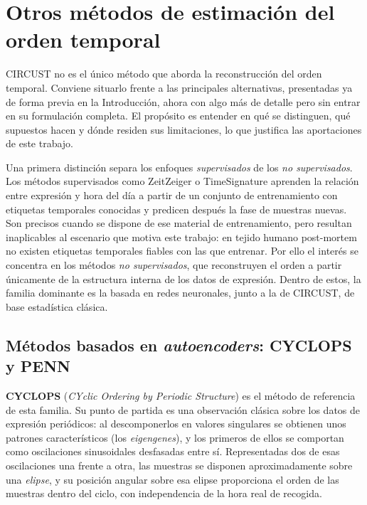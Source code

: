 \documentclass[12pt, a4paper]{report}
\begin{document}
\section{Otros métodos de estimación del orden temporal}
\label{sec:otros-metodos}

CIRCUST no es el único método que aborda la reconstrucción del orden temporal. Conviene situarlo frente a las principales alternativas, presentadas ya de forma previa en la Introducción, ahora con algo más de detalle pero sin entrar en su formulación completa. El propósito es entender en qué se distinguen, qué supuestos hacen y dónde residen sus limitaciones, lo que justifica las aportaciones de este trabajo.

Una primera distinción separa los enfoques \emph{supervisados} de los \emph{no supervisados}. Los métodos supervisados como ZeitZeiger \cite{zeitzeiger2016} o TimeSignature \cite{timesignature2018} aprenden la relación entre expresión y hora del día a partir de un conjunto de entrenamiento con etiquetas temporales conocidas y predicen después la fase de muestras nuevas. Son precisos cuando se dispone de ese material de entrenamiento, pero resultan inaplicables al escenario que motiva este trabajo: en tejido humano post-mortem no existen etiquetas temporales fiables con las que entrenar. Por ello el interés se concentra en los métodos \emph{no supervisados}, que reconstruyen el orden a partir únicamente de la estructura interna de los datos de expresión. Dentro de estos, la familia dominante es la basada en redes neuronales, junto a la de CIRCUST, de base estadística clásica.

\subsection{Métodos basados en \textit{autoencoders}: CYCLOPS y PENN}
\label{subsec:autoencoders}

\textbf{CYCLOPS} (\textit{CYclic Ordering by Periodic Structure}) \cite{CYCLOPS} es el método de referencia de esta familia. Su punto de partida es una observación clásica sobre los datos de expresión periódicos: al descomponerlos en valores singulares se obtienen unos patrones característicos (los \textit{eigengenes}), y los primeros de ellos se comportan como oscilaciones sinusoidales desfasadas entre sí. Representadas dos de esas oscilaciones una frente a otra, las muestras se disponen aproximadamente sobre una \emph{elipse}, y su posición angular sobre esa elipse proporciona el orden de las muestras dentro del ciclo, con independencia de la hora real de recogida.
\end{document}
